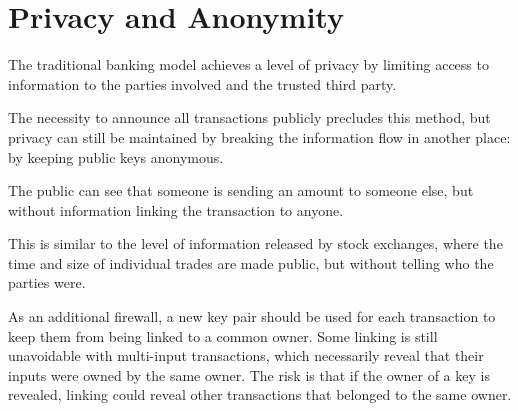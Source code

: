 \section{Privacy and Anonymity}

The traditional banking model achieves a level of privacy by limiting access to information to the parties involved and the trusted third party.

The necessity to announce all transactions publicly precludes this method, but privacy can still be maintained by breaking the information flow in another place: by keeping public keys anonymous.

The public can see that someone is sending an amount to someone else, but without information linking the transaction to anyone.

This is similar to the level of information released by stock exchanges, where the time and size of individual trades are made public, but without telling who the parties were.

As an additional firewall, a new key pair should be used for each transaction to keep them from being linked to a common owner. Some linking is still unavoidable with multi-input transactions, which necessarily reveal that their inputs were owned by the same owner. The risk is that if the owner of a key is revealed, linking could reveal other transactions that belonged to the same owner.